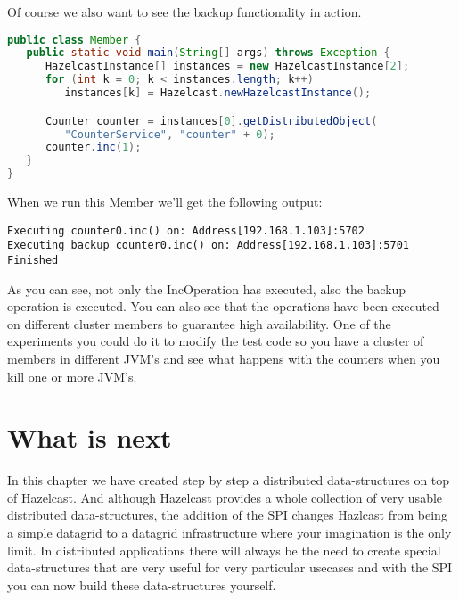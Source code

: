Of course we also want to see the backup functionality in action.
\begin{lstlisting}[language=java]
public class Member {
   public static void main(String[] args) throws Exception {
      HazelcastInstance[] instances = new HazelcastInstance[2];
      for (int k = 0; k < instances.length; k++) 
         instances[k] = Hazelcast.newHazelcastInstance();

      Counter counter = instances[0].getDistributedObject(
         "CounterService", "counter" + 0);
      counter.inc(1);
   }
}
\end{lstlisting}
When we run this Member we'll get the following output:
\begin{lstlisting}
Executing counter0.inc() on: Address[192.168.1.103]:5702
Executing backup counter0.inc() on: Address[192.168.1.103]:5701
Finished
\end{lstlisting}
As you can see, not only the IncOperation has executed, also the backup operation is executed. You can also see that the operations have been executed on different cluster members to guarantee high availability. One of the experiments you could do it to modify the test code so you have a cluster of members in different JVM's and see what happens with the counters when you kill one or more JVM's. 

\section{What is next}
In this chapter we have created step by step a distributed data-structures on top of Hazelcast. And although Hazelcast provides a whole collection of very usable distributed data-structures, the addition of the SPI changes Hazlcast from being a simple datagrid to a datagrid infrastructure where your imagination is the only limit. In distributed applications there will always be the need to create special data-structures that are very useful for very particular usecases and with the SPI you can now build these data-structures yourself.
